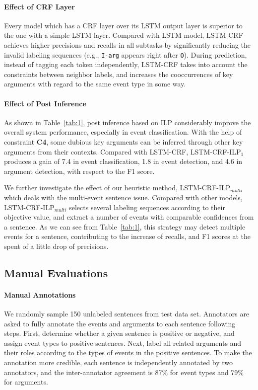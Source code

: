 \documentclass{article}
\begin{document}
\paragraph{Effect of CRF Layer}
Every model which has a CRF layer over its LSTM output layer is superior to the one with a simple LSTM layer. Compared with LSTM model, LSTM-CRF achieves higher precisions and recalls in all subtasks by significantly reducing the invalid labeling sequences (e.g., \texttt{I-arg} appears right after \texttt{O}). During prediction, instead of tagging each token independently, LSTM-CRF takes into account the constraints between neighbor labels, and increases the cooccurrences of key arguments with regard to the same event type in some way.

\paragraph{Effect of Post Inference}
As shown in Table~\ref{tab:1}, post inference based on ILP considerably improve the overall system performance, especially in event classification. With the help of constraint \textbf{C4},  some dubious key arguments can be inferred through other key arguments from their contexts. Compared with LSTM-CRF, LSTM-CRF-ILP$_1$ produces a gain of 7.4 in event classification, 1.8 in event detection, and 4.6 in argument detection, with respect to the F1 score.

We further investigate the effect of our heuristic method, LSTM-CRF-ILP$_{multi}$ which deals with the multi-event sentence issue. Compared with other models, LSTM-CRF-ILP$_{multi}$ selects several labeling sequences according to their objective value, and extract a number of events with comparable confidences from a sentence. As we can see from Table~\ref{tab:1}, this strategy may detect multiple events for a sentence, contributing to the increase of recalls, and F1 scores at the spent of a little drop of precisions. 

\subsection{Manual Evaluations}
\paragraph{Manual Annotations}
We randomly sample 150 unlabeled sentences from test data set. Annotators are asked to fully annotate the events and arguments to each sentence following steps. First, determine whether a given sentence is positive or negative, and assign event types to positive sentences. Next, label all related arguments and their roles according to the types of events in the positive sentences. To make the annotation more credible, each sentence is independently annotated by two annotators, and the inter-annotator agreement is 87\% for event types and 79\% for arguments.
\end{document}
